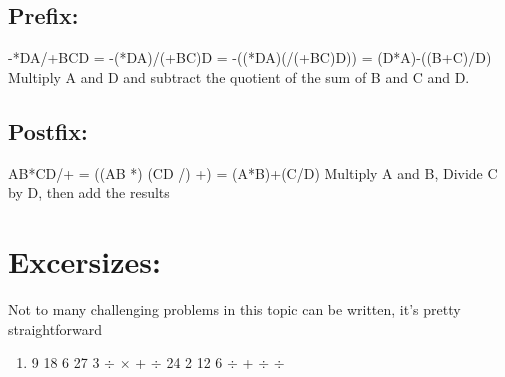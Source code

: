 \documentclass{article}
\begin{document}
\subsection{Prefix:}
-*DA/+BCD = -(*DA)/(+BC)D = -((*DA)(/(+BC)D)) = (D*A)-((B+C)/D) Multiply A and D and subtract the quotient of the sum of B and C and D.

\subsection{Postfix:}
AB*CD/+ = ((AB *) (CD /) +) = (A*B)+(C/D)
Multiply A and B, Divide C by D, then add the results

\section{Excersizes:}
Not to many challenging problems in this topic can be written, it's pretty straightforward

\begin{enumerate}

\item 9 18 6 27 3 $\div$ $\times$ + $\div$ 24 2 12 6 $\div$ + $\div$ $\div$

\end{enumerate}



\enddocument
\end{document}
